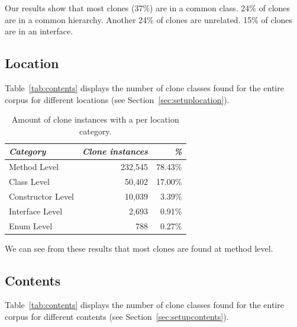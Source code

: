 Our results show that most clones (37\%) are in a common class. 24\% of clones are in a common hierarchy. Another 24\% of clones are unrelated. 15\% of clones are in an interface.

\subsection{Location}
Table~\ref{tab:contents} displays the number of clone classes found for the entire corpus for different locations (see Section~\ref{sec:setuplocation}).
\begin{table}[H]
\centering
\begin{tabular}{@{}lrr@{}}
\toprule
\textit{\textbf{Category}} & \textit{\textbf{Clone instances}} & \textit{\textbf{\%}} \\ \midrule
Method Level & 232,545 & 78.43\% \\
Class Level & 50,402 & 17.00\% \\
Constructor Level & 10,039 & 3.39\% \\
Interface Level & 2,693 & 0.91\% \\
Enum Level & 788 & 0.27\% \\
\end{tabular}
\caption{Amount of clone instances with a per location category.}
\label{tab:location}
\end{table}

We can see from these results that most clones are found at method level.

\subsection{Contents}
Table~\ref{tab:contents} displays the number of clone classes found for the entire corpus for different contents (see Section~\ref{sec:setupcontents}).

